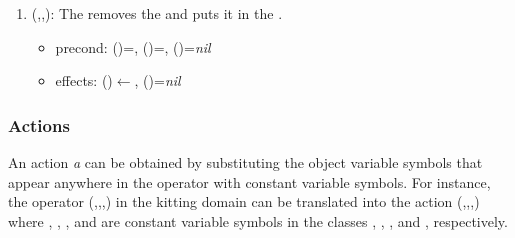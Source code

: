 \begin{enumerate}
\item {}(,,): The   removes the   and puts it in the  .
    \begin{itemize}
        \item precond: ()=, ()=, ()=\textit{nil}
        \item effects: ()$\leftarrow$, ()=\textit{nil}
    \end{itemize}
\end{enumerate}

\subsubsection{Actions}
An action \textit{a} can be obtained by substituting the object variable symbols that
appear anywhere in the operator with constant variable symbols. For instance, the operator (,,,) in the kitting domain can be translated into the action (,,,) where , , , and  are constant variable symbols in the classes , , , and , respectively.





